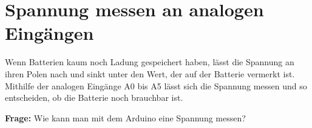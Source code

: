 \documentclass[ngerman, 11pt]{scrreprt}
\begin{document}
	\setcounter{chapter}{5}
	\setcounter{section}{1}
	
	\section{Spannung messen an analogen Eingängen}
	
	Wenn Batterien kaum noch Ladung gespeichert haben, lässt die Spannung an ihren Polen nach und sinkt unter den Wert, der auf der Batterie vermerkt ist. Mithilfe der analogen Eingänge A0 bis A5 lässt sich die Spannung messen und so entscheiden, ob die Batterie noch brauchbar ist.
	
	\begin{ziel}
		\textbf{Frage:} Wie kann man mit dem Arduino eine Spannung messen?
	\end{ziel}
	
\end{document}
